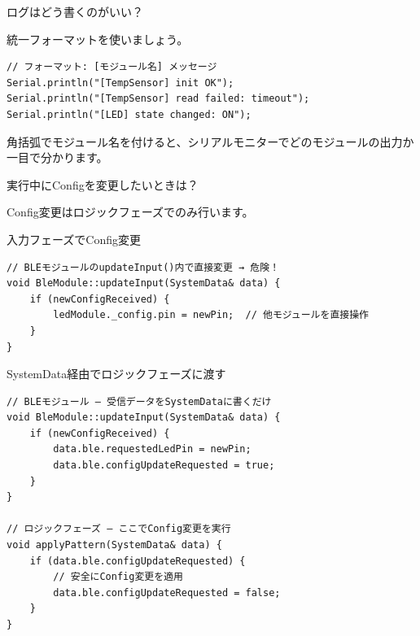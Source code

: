\begin{qabox}{ログはどう書くのがいい？}

統一フォーマットを使いましょう。

\begin{lstlisting}
// フォーマット: [モジュール名] メッセージ
Serial.println("[TempSensor] init OK");
Serial.println("[TempSensor] read failed: timeout");
Serial.println("[LED] state changed: ON");
\end{lstlisting}

角括弧でモジュール名を付けると、シリアルモニターでどのモジュールの出力か一目で分かります。

\end{qabox}

\begin{qabox}{実行中にConfigを変更したいときは？}

Config変更はロジックフェーズでのみ行います。

\begin{badexample}{入力フェーズでConfig変更}
\begin{lstlisting}
// BLEモジュールのupdateInput()内で直接変更 → 危険！
void BleModule::updateInput(SystemData& data) {
    if (newConfigReceived) {
        ledModule._config.pin = newPin;  // 他モジュールを直接操作
    }
}
\end{lstlisting}
\end{badexample}

\begin{goodexample}{SystemData経由でロジックフェーズに渡す}
\begin{lstlisting}
// BLEモジュール — 受信データをSystemDataに書くだけ
void BleModule::updateInput(SystemData& data) {
    if (newConfigReceived) {
        data.ble.requestedLedPin = newPin;
        data.ble.configUpdateRequested = true;
    }
}

// ロジックフェーズ — ここでConfig変更を実行
void applyPattern(SystemData& data) {
    if (data.ble.configUpdateRequested) {
        // 安全にConfig変更を適用
        data.ble.configUpdateRequested = false;
    }
}
\end{lstlisting}
\end{goodexample}

\end{qabox}

